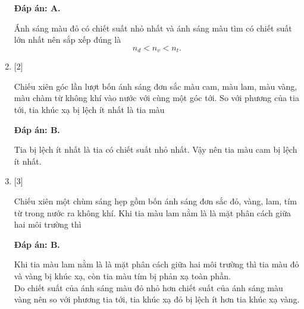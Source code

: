\begin{enumerate}[label=\bfseries Câu \arabic*:]
	\loigiai
	{		\textbf{Đáp án: A.}
		
		Ánh sáng màu đỏ có chiết suất nhỏ nhất và ánh sáng màu tìm có chiết suất lớn nhất nên sắp xếp đúng là
		$$
		n_{d} < n_{v} < n_{t}.
		$$
		
	}
	

	
	\item {} [2]
	\cauhoi
	{Chiếu xiên góc lần lượt bốn ánh sáng đơn sắc màu cam, màu lam, màu vàng, màu chàm từ không khí vào nước với cùng một góc tới. So với phương của tia tới, tia khúc xạ bị lệch ít nhất là tia màu
	}
	
	\loigiai
	{		\textbf{Đáp án: B.}
		
		Tia bị lệch ít nhất là tia có chiết suất nhỏ nhất. Vậy nên tia màu cam bị lệch ít nhất.
		
	}
	
	\item {} [3]
	\cauhoi
	{Chiếu xiên một chùm sáng hẹp gồm bốn ánh sáng đơn sắc đỏ, vàng, lam, tím từ trong nước ra không khí. Khi tia màu lam nằm là là mặt phân cách giữa hai môi trường thì
	}
	
	\loigiai
	{		\textbf{Đáp án: B.}
		
		Khi tia màu lam nằm là là mặt phân cách giữa hai môi trường thì tia màu đỏ và vàng bị khúc xạ, còn tia màu tím bị phản xạ toàn phần.\\
		Do chiết suất của ánh sáng màu đỏ nhỏ hơn chiết suất của ánh sáng màu vàng nên so với phương tia tới, tia khúc xạ đỏ bị lệch ít hơn tia khúc xạ vàng.
		
}
\end{enumerate}
